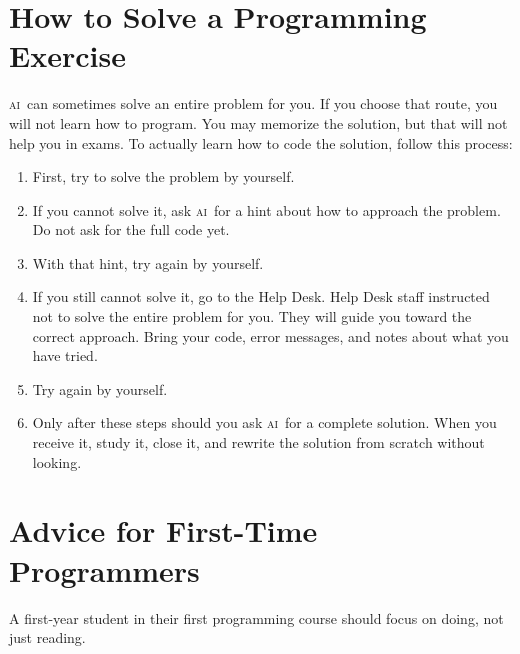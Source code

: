\documentclass[%
 reprint,
 amsmath,amssymb,
 aps,
]{revtex4-2}
\newcommand{\AI}{\textsc{ai}}
\begin{document}
\section{How to Solve a Programming Exercise}

\AI\ can sometimes solve an entire problem for you. 
If you choose that route, you will not learn how to program. 
You may memorize the solution, but that will not help you in exams.
To actually learn how to code the solution, follow this process:

\begin{enumerate}[label=\roman*)]
	
	\item 
	First, try to solve the problem by yourself.
	
	\item 
	If you cannot solve it, ask \AI\ for a hint about how to approach the problem. 
	Do not ask for the full code yet.
	
	\item 
	With that hint, try again by yourself.
	
	\item 
	If you still cannot solve it, go to the Help Desk. 
	Help Desk staff instructed not to solve the entire problem for you. 
	They will guide you toward the correct approach. 
	Bring your code, error messages, and notes about what you have tried.
	
	\item 
	Try again by yourself.
	
	\item 
	Only after these steps should you ask \AI\ for a complete solution. 
	When you receive it, study it, close it, and rewrite the solution from scratch without looking.
	
\end{enumerate}




\section{Advice for First-Time Programmers}

A first-year student in their first programming course should focus on doing, not just reading.
\end{document}
